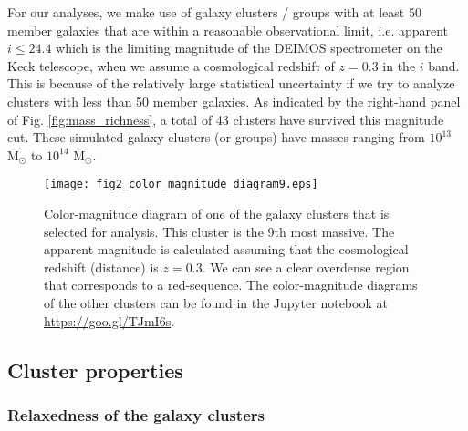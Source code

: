 For our analyses, we make use of galaxy clusters / groups 
with at least 50 member galaxies that are within a reasonable observational limit, 
i.e. apparent $i \leq 24.4$ which is the limiting magnitude of the DEIMOS
spectrometer on the Keck telescope, when we assume a cosmological redshift of $z = 0.3$
in the $i$ band. 
This is because of the relatively large statistical uncertainty if we try
to analyze clusters with less than 50 member galaxies. 
As indicated by the right-hand panel of Fig. \ref{fig:mass_richness}, 
a total of 43 clusters have 
survived this magnitude cut. These simulated galaxy clusters (or groups) have 
masses ranging from $10^{13}$ M$_\odot $ to $10^{14}$ M$_\odot$.  

\begin{figure}
	\centering
	\texttt{[image: fig2\_color\_magnitude\_diagram9.eps]}
	\caption{Color-magnitude diagram of one of the galaxy clusters that is selected for 
		analysis. This cluster is the 9th most massive. 
		The apparent magnitude is calculated assuming that 
		the cosmological redshift (distance) is $z = 0.3$. 
		We can see a clear overdense region that corresponds to a red-sequence.
		The color-magnitude diagrams of the other clusters can be found in the
		Jupyter notebook at \href{https://github.com/karenyyng/galaxy_DM_offset/blob/master/code/analyses/fig2_color_magnitude_diagram.ipynb}{https://goo.gl/TJmI6s}.
		\label{fig:color_magnitude_diagram}
	} 
\end{figure}

\subsection{Cluster properties}
\label{subsubsec:cluster_properties}
\subsubsection{Relaxedness of the galaxy clusters}

